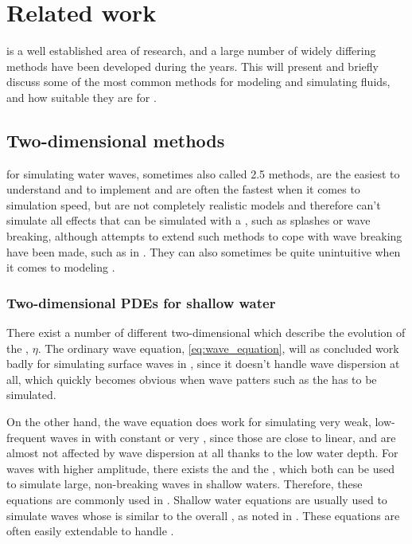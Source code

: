\chapter{Related work}


\CFD is a well established area of research, and a large number of widely differing methods have been developed during the years. This \levelname will present and briefly discuss some of the most common methods for modeling and simulating fluids, and how suitable they are for \thisprojectwork.

\section{Two-dimensional methods}

 for simulating water waves, sometimes also called 2.5 methods, are the easiest to understand and to implement and are often the fastest when it comes to simulation speed, but are not completely realistic models and therefore can't simulate all effects that can be simulated with a , such as splashes or wave breaking, although attempts to extend such methods to cope with wave breaking have been made, such as in \citep{Miklos2009}. They can also sometimes be quite unintuitive when it comes to modeling \FSI.

\subsection{Two-dimensional PDEs for shallow water}

There exist a number of different two-dimensional \PDEs which describe the evolution of the , $\eta$. The ordinary wave equation, \eqref{eq:wave_equation}, will as concluded work badly for simulating surface waves in , since it doesn't handle wave dispersion at all, which quickly becomes obvious when wave patters such as the  has to be simulated.

On the other hand, the wave equation does work for simulating very weak, low-frequent waves in  with constant or very , since those are close to linear, and are almost not affected by wave dispersion at all thanks to the low water depth. For waves with higher amplitude, there exists the  and the , which both can be used to simulate large, non-breaking waves in shallow waters. Therefore, these equations are commonly used in \SWS. Shallow water equations are usually used to simulate waves whose \wavelength is similar to the overall , as noted in \citep{Thurey2006}. These equations are often easily extendable to handle \FSI.

